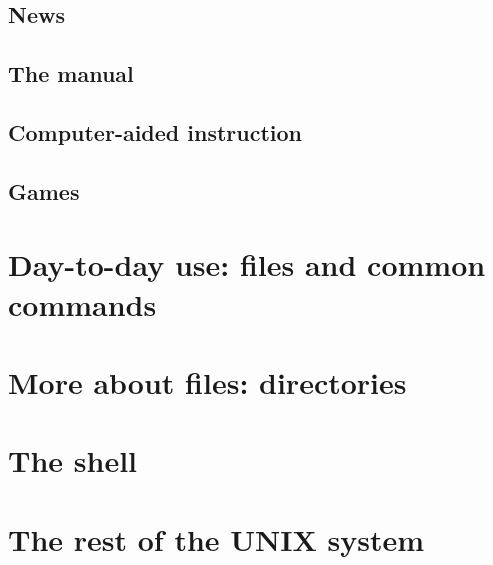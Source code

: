 \subsection{News}
\subsection{The manual}
\subsection{Computer-aided instruction}
\subsection{Games}

\section{Day-to-day use: files and common commands}
\section{More about files: directories}
\section{The shell}
\section{The rest of the UNIX system}
